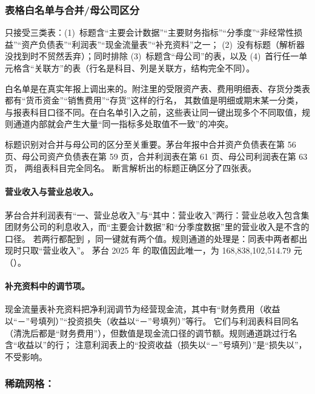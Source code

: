 \subsubsection{表格白名单与合并/母公司区分}
\label{sec:ext-whitelist}

 只接受三类表：(1)~标题含“主要会计数据”“主要财务指标”“分季度”“非经常性损益”“资产负债表”“利润表”“现金流量表”“补充资料”之一；
(2)~没有标题（解析器没找到时不贸然丢弃）；同时排除 (3)~标题含“母公司”的表，以及 (4)~首行任一单元格含“关联方”的表（行名是科目、列是关联方，结构完全不同）。

白名单是在真实年报上调出来的。附注里的受限资产表、费用明细表、存货分类表都有“货币资金”“销售费用”“存货”这样的行名，
其数值是明细或期末某一分类，与报表科目口径不同。在白名单引入之前，这些表让同一键出现多个不同取值，规则通道内部就会产生大量“同一指标多处取值不一致”的冲突。

标题识别对合并与母公司的区分至关重要。茅台年报中合并资产负债表在第 56 页、母公司资产负债表在第 59 页，合并利润表在第 61 页、母公司利润表在第 63 页，
两组表科目完全同名。 断言解析出的标题正确区分了四张表。

\paragraph{营业收入与营业总收入。}
茅台合并利润表有“一、营业总收入”与“其中：营业收入”两行：营业总收入包含集团财务公司的利息收入，而“主要会计数据”和“分季度数据”里的营业收入是不含的口径。
若两行都配到 ，同一键就有两个值。规则通道的处理是：同表中两者都出现时只取“营业收入”。
茅台 2025 年  的取值因此唯一，为 168,838,102,514.79 元（）。

\paragraph{补充资料中的调节项。}
现金流量表补充资料把净利润调节为经营现金流，其中有“财务费用（收益以“－”号填列）”“投资损失（收益以“－”号填列）”等行。
它们与利润表科目同名（清洗后都是“财务费用”），但数值是现金流口径的调节额。规则通道跳过行名含“收益以”的行；
注意利润表上的“投资收益（损失以“－”号填列）”是“损失以”，不受影响。

\subsubsection{稀疏网格：}
\label{sec:ext-sparse}

